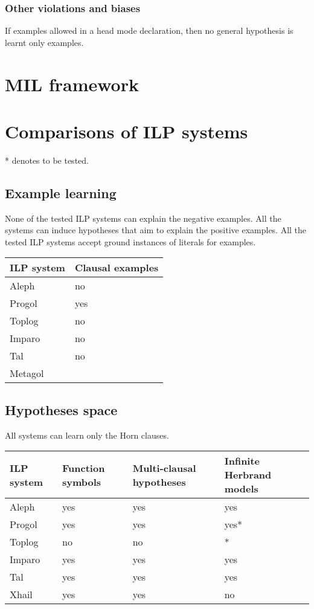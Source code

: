 \subsection{Other violations and biases}
If examples allowed in a head mode declaration, then no general hypothesis is learnt only examples.

\chapter{MIL framework}

\chapter{Comparisons of ILP systems}
* denotes to be tested.
\section{Example learning}
None of the tested ILP systems can explain the negative examples. All the systems can induce hypotheses that aim to explain the positive examples. All the tested ILP systems accept ground instances of literals for examples.
\begin{center}
    \begin{tabular}{ | l | p{5cm} |}
    \hline
    ILP system &  Clausal examples \\ \hline
    Aleph & no\\ \hline
    Progol & yes\\ \hline
    Toplog & no\\ \hline
    Imparo & no\\ \hline
    Tal & no\\ \hline
    Metagol & \\ \hline
    \hline
    \end{tabular}
\end{center}

\section{Hypotheses space}
All systems can learn only the Horn clauses.
\begin{center}
    \begin{tabular}{ | l | l | l | p{5cm} |}
    \hline
    ILP system & Function symbols & Multi-clausal hypotheses & Infinite Herbrand models\\ \hline
    Aleph & yes & yes & yes\\ \hline
    Progol & yes & yes & yes*\\ \hline
    Toplog & no & no & *\\ \hline
    Imparo & yes & yes & yes\\ \hline
    Tal & yes & yes & yes\\ \hline
    Xhail & yes & yes & no\\ \hline
    \hline
    \end{tabular}
\end{center}

